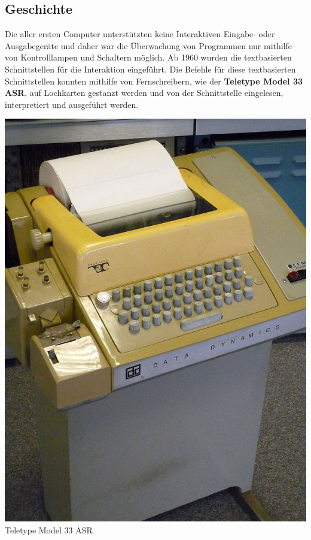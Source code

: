\documentclass[12pt,a4paper]{report}
\begin{document}
\begin{onehalfspace}
\subsection{Geschichte}

Die aller ersten Computer unterstützten keine Interaktiven Eingabe- oder Ausgabegeräte und daher war die Überwachung von Programmen nur mithilfe von Kontrolllampen und Schaltern möglich. Ab 1960 wurden die textbasierten Schnittstellen für die Interaktion eingeführt. Die Befehle für diese textbasierten Schnittstellen konnten mithilfe von Fernschreibern, wie der \textbf{Teletype Model 33 ASR}, auf Lochkarten gestanzt werden und von der Schnittstelle eingelesen, interpretiert und ausgeführt werden. \cite{wiki06} \cite{wiki08} \\

\begin{center}
\includegraphics[scale=0.52]{img/teletype.jpg}\\
Teletype Model 33 ASR \cite{wiki08}
\end{center}


\end{onehalfspace}
\end{document}

